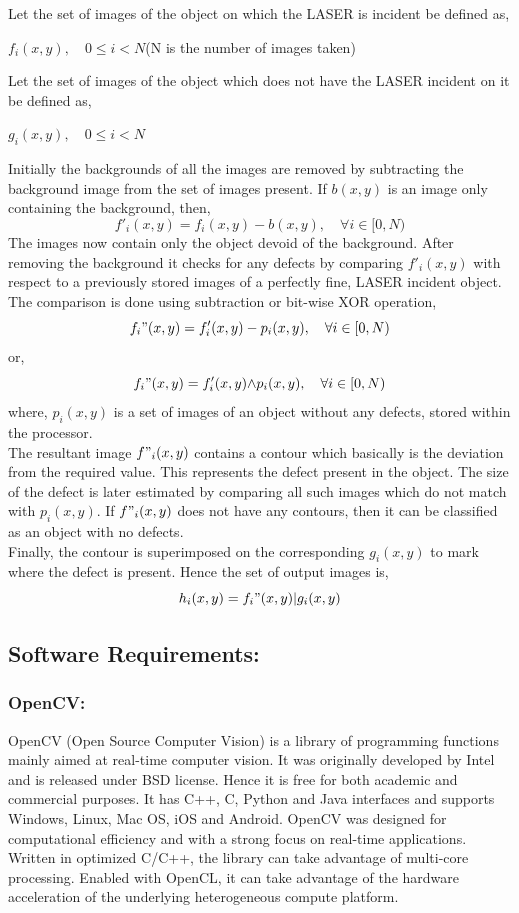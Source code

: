 \documentclass[12pt]{article}
\begin{document}
{\quad}Let the set of images of the object on which the LASER is incident be defined as,\\
\begin{center}
$f_i(x,y),{\quad}0{\leq}i<N${\quad}(N is the number of images taken)
\end{center}

{\quad}Let the set of images of the object which does not have the LASER incident on it be defined as,\\
\begin{center}
$g_i(x,y),{\quad}0{\leq}i<N$
\end{center}

{\quad} Initially the backgrounds of all the images are removed by subtracting the background image from the set of images present. If $b(x,y)$ is an image only containing the background, then,
$$f'_i(x,y)=f_i(x,y)-b(x,y),{\quad}\forall i\in[0,N)$$
The images now contain only the object devoid of the background. After removing the background it checks for any defects by comparing $f'_i(x,y)$ with respect to a previously stored images of a perfectly fine, LASER incident object. The comparison is done using subtraction or bit-wise XOR operation,
$$f_i"(x,y)=f'_i(x,y)-p_i(x,y),{\quad}\forall i\in[0,N)$$
or,
$$f_i"(x,y)=f'_i(x,y){\wedge}p_i(x,y),{\quad}\forall i\in[0,N)$$
where, $p_i(x,y)$ is a set of images of an object without any defects, stored within the processor.\\

{\quad}The resultant image $f"_i(x,y)$ contains a contour which basically is the deviation from the required value. This represents the defect present in the object. The size of the defect is later estimated by comparing all such images which do not match with $p_i(x,y)$. If $f"_i(x,y)$ does not have any contours, then it can be classified as an object with no defects.\\

{\quad}Finally, the contour is superimposed on the corresponding $g_i(x,y)$ to mark where the defect is present. Hence the set of output images is,
$$h_i(x,y)=f_i"(x,y)\vert g_i(x,y)$$

\subsection{Software Requirements:}
\subsubsection{OpenCV:}
{\quad}OpenCV (Open Source Computer Vision) is a library of programming functions mainly aimed at real-time computer vision. It was originally developed by Intel and is released under BSD license. Hence it is free for both academic and commercial purposes.  It has C++, C, Python and Java interfaces and supports Windows, Linux, Mac OS, iOS and Android. OpenCV was designed for computational efficiency and with a strong focus on real-time applications. Written in optimized C/C++, the library can take advantage of multi-core processing. Enabled with OpenCL, it can take advantage of the hardware acceleration of the underlying heterogeneous compute platform.
\end{document}
